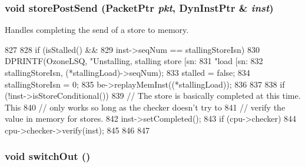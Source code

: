 \hypertarget{classOzoneLWLSQ_af841afeea43eb2b2272f0dfaf17c3f4e}{
\subsubsection[{storePostSend}]{\setlength{\rightskip}{0pt plus 5cm}void storePostSend ({\bf PacketPtr} {\em pkt}, \/  {\bf DynInstPtr} \& {\em inst})}}
\label{classOzoneLWLSQ_af841afeea43eb2b2272f0dfaf17c3f4e}
Handles completing the send of a store to memory. 


\begin{DoxyCode}
827 {
828     if (isStalled() &&
829         inst->seqNum == stallingStoreIsn) {
830         DPRINTF(OzoneLSQ, "Unstalling, stalling store [sn:%
831                 "load [sn:%
832                 stallingStoreIsn, (*stallingLoad)->seqNum);
833         stalled = false;
834         stallingStoreIsn = 0;
835         be->replayMemInst((*stallingLoad));
836     }
837 
838     if (!inst->isStoreConditional()) {
839         // The store is basically completed at this time. This
840         // only works so long as the checker doesn't try to
841         // verify the value in memory for stores.
842         inst->setCompleted();
843         if (cpu->checker) {
844             cpu->checker->verify(inst);
845         }
846     }
847 }
\end{DoxyCode}
\hypertarget{classOzoneLWLSQ_a05f299b443f8cc73a93d61572edc0218}{
\subsubsection[{switchOut}]{\setlength{\rightskip}{0pt plus 5cm}void switchOut ()}}
\label{classOzoneLWLSQ_a05f299b443f8cc73a93d61572edc0218}



